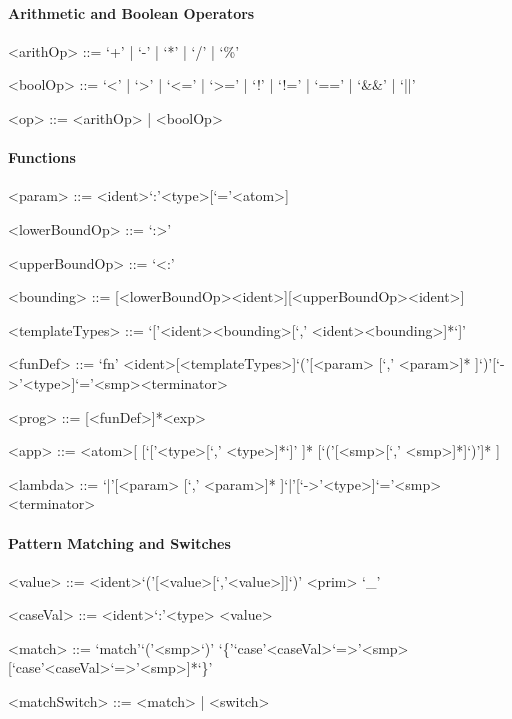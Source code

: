 \documentclass[11pt]{article} %
\begin{document}
\paragraph{Arithmetic and Boolean Operators}

\begin{grammar}

<arithOp> ::= `+' | `-' | `*' | `/' | `\%'

<boolOp> ::= `<' | `>' | `<=' | `>=' | `!' | `!=' | `==' | `\&\&' | `||'

<op> ::= <arithOp> | <boolOp> 

\end{grammar}

\paragraph{Functions}

\begin{grammar}

<param> ::= <ident>`:'<type>[`='<atom>]

<lowerBoundOp> ::= `:>'

<upperBoundOp> ::= `<:'

<bounding> ::= [<lowerBoundOp><ident>][<upperBoundOp><ident>]

<templateTypes> ::= `['<ident><bounding>[`,' <ident><bounding>]*`]'

<funDef> ::= `fn' <ident>[<templateTypes>]`('[<param> [`,' <param>]* ]`)'[`->'<type>]`='<smp><terminator>

<prog> ::= [<funDef>]*<exp>

<app> ::= <atom>[ [`['<type>[`,' <type>]*`]' ]* [`('[<smp>[`,' <smp>]*]`)']* ]

<lambda> ::= `|'[<param> [`,' <param>]* ]`|'[`->'<type>]`='<smp><terminator>

\end{grammar}

\paragraph{Pattern Matching and Switches}

\begin{grammar}

<value> ::= <ident>`('[<value>[`,'<value>]]`)'
\alt <prim>
\alt `\_'

<caseVal> ::= <ident>`:'<type>
\alt <value>

<match> ::= `match'`('<smp>`)' `\{'`case'<caseVal>`=>'<smp>[`case'<caseVal>`=>'<smp>]*`\}'

<matchSwitch> ::= <match> | <switch>

\end{grammar}
\end{document}
